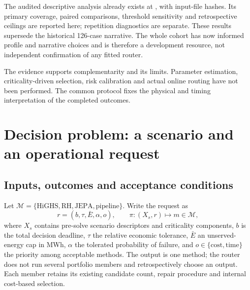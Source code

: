 The audited descriptive analysis already exists at
, with input-file hashes. Its primary
coverage, paired comparisons, threshold sensitivity and retrospective
ceilings are reported here; repetition diagnostics are separate. These
results supersede the historical 126-case narrative. The whole cohort has
now informed profile and narrative choices and is therefore a development
resource, not independent confirmation of any fitted router.

The evidence supports complementarity and its limits. Parameter estimation,
criticality-driven selection, risk calibration and actual online routing
have not been performed. The common protocol fixes the physical and timing
interpretation of the completed outcomes.



\section{Decision problem: a scenario and an operational request}
\subsection{Inputs, outcomes and acceptance conditions}
Let $\mathcal M=\{\text{HiGHS},\text{RH},\text{JEPA},\text{pipeline}\}$.
Write the request as
\begin{equation}
 r=(b,\tau,\bar E,\alpha,o),\qquad
 \pi:(X_s,r)\longmapsto m\in\mathcal M,
 \label{eq:request}
\end{equation}
where $X_s$ contains pre-solve scenario descriptors and criticality components,
$b$ is the total decision deadline, $\tau$ the relative economic tolerance,
$\bar E$ an unserved-energy cap in MWh, $\alpha$ the tolerated probability of
failure, and $o\in\{\text{cost},\text{time}\}$ the priority among acceptable
methods. The output is one method; the router does not run several portfolio
members and retrospectively choose an output. Each member retains its
existing candidate count, repair procedure and internal cost-based selection.

